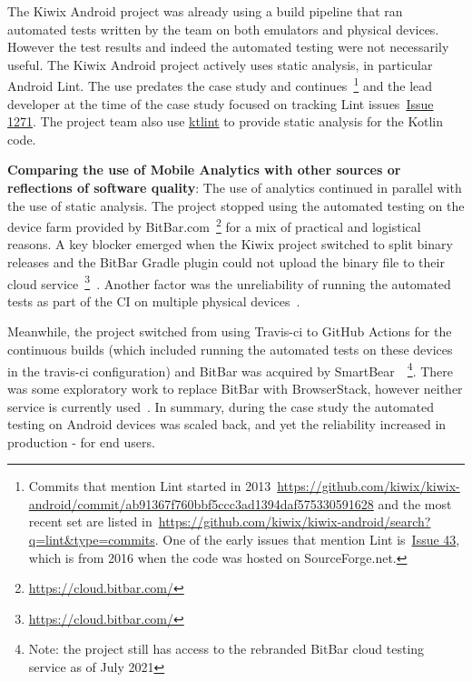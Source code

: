 The Kiwix Android project was already using a build pipeline that ran automated tests written by the team on both emulators and physical devices. However the test results and indeed the automated testing were not necessarily useful. %
The Kiwix Android project actively uses static analysis, in particular Android Lint. The use predates the case study and continues~\footnote{Commits that mention Lint started in 2013~\url{https://github.com/kiwix/kiwix-android/commit/ab91367f760bbf5ccc3ad1394daf575330591628} and the most recent set are listed in~\url{https://github.com/kiwix/kiwix-android/search?q=lint&type=commits}. One of the early issues that mention Lint is~\href{https://github.com/kiwix/kiwix-android/issues/43}{Issue 43}, which is from 2016 when the code was hosted on SourceForge.net.} and the lead developer at the time of the case study focused on tracking Lint issues~\href{https://github.com/kiwix/kiwix-android/issues/1271}{Issue 1271}. The project team also use \href{https://ktlint.github.io/}{ktlint} to provide static analysis for the Kotlin code.

\textbf{Comparing the use of Mobile Analytics with other sources or reflections of software quality}: The use of analytics continued in parallel with the use of static analysis. The project stopped using the automated testing on the device farm provided by BitBar.com~\footnote{\url{https://cloud.bitbar.com/}} for a mix of practical and logistical reasons. A key blocker emerged when the Kiwix project switched to split binary releases and the BitBar Gradle plugin could not upload the binary file to their cloud service~\footnote{\url{https://cloud.bitbar.com/}}~\citep{kiwixandroid_issue_1228_bibbar_not_working_with_split_apks}. Another factor was the unreliability of running the automated tests as part of the CI on multiple physical devices~\citep{kiwixandroid_issue_1223_bitbar_should_run_tests_on_multiple_devices}.

Meanwhile, the project switched from using Travis-ci to GitHub Actions for the continuous builds (which included running the automated tests on these devices in the travis-ci configuration) and BitBar was acquired by SmartBear~\citep{bitbar2019_smartbear_acquired_bitbar}~\footnote{Note: the project still has access to the rebranded BitBar cloud testing service as of  July 2021}. There was some exploratory work to replace BitBar with BrowserStack, however neither service is currently used~\citep{kiwixandroid_issue_1223_bitbar_should_run_tests_on_multiple_devices}. In summary, during the case study the automated testing on Android devices was scaled back, and yet the reliability increased in production - for end users.

